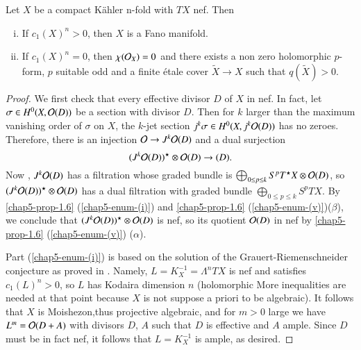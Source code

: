 \begin{secprop}\label{chap5-prop-3.9}
Let $X$ be a compact K\"ahler n-fold with $TX$ nef. Then
    \begin{enumerate}[(i)]
    \item If $c_{1}(X)^{n} > 0$, then $X$ is a Fano manifold.\label{chap5-enum-[i]} 
    \item If $c_{1}(X)^{n} = 0$, then $^{}{\chi}(\mathcal{O}_{X}) = 0$ and there exists a non zero holomorphic $p$-form, $p$ suitable odd and a finite \'etale cover $\widetilde{X} \rightarrow X$ such that $q(\widetilde{X}) > 0$.\label{chap5-enum-[ii]}
    \end{enumerate}
\end{secprop}

\begin{proof}
We first check that every effective divisor $D$ of $X$ in nef. In fact, let $\sigma \in H^{0}(X, \mathcal{O}(D))$ be a section with divisor $D$. Then for $k$ larger than the maximum vanishing order of $\sigma$ on $X$, the $k$-jet section $j^{k}\sigma \in H^{0}(X, j^{k}\mathcal{O}(D))$ has no zeroes. Therefore, there is an injection $\mathcal{O} \rightarrow J^{k}\mathcal{O}(D)$ and a dual surjection
$$
(J^{k}\mathcal{O}(D))^{\star} \otimes \mathcal{O}(D)\rightarrow(D).
$$
Now , $J^{k}\mathcal{O}(D)$ has a filtration whose graded bundle is $\bigoplus_{0\leq p\leq k}S^{p}T^{\star}X\otimes \mathcal{O}(D)$,
so $(J^{k}\mathcal{O}(D))^{\star} \otimes \mathcal{O} (D)$ has a dual filtration with graded bundle $\bigoplus_{0\leq p\leq k}S^{p}TX$.
By \ref{chap5-prop-1.6} (\ref{chap5-enum-(i)}) and \ref{chap5-prop-1.6} (\ref{chap5-enum-(v)})($\beta$), we conclude that $(J^{k}\mathcal{O}(D))^{\star}\otimes \mathcal{O} (D)$ is nef, so its quotient $\mathcal{O} (D)$ in nef by \ref{chap5-prop-1.6}
(\ref{chap5-enum-(v)}) ($\alpha$). 

Part (\ref{chap5-enum-(i)}) is based on the solution of the Grauert-Riemenschneider conjecture as proved in \cite{chap5-keyDe85}. Namely, $L=K_{X}^{-1} = \Lambda^{n}TX$ is nef and satisfies $c_{1}(L)^{n} > 0$, so $L$ has Kodaira dimension $n$ (holomorphic More inequalities are needed at that point because $X$ is not suppose a priori to be algebraic).
It follows that $X$ is Moishezon,thus projective algebraic, and for $m > 0$ large we have $L^{m} = \mathcal{O}(D+A)$ with divisors $D$, $A$ such that $D$ is effective and $A$ ample. Since $D$ must be in fact nef, it follows that $L=K_{X}^{-1}$ is ample, as desired.


\end{proof}
